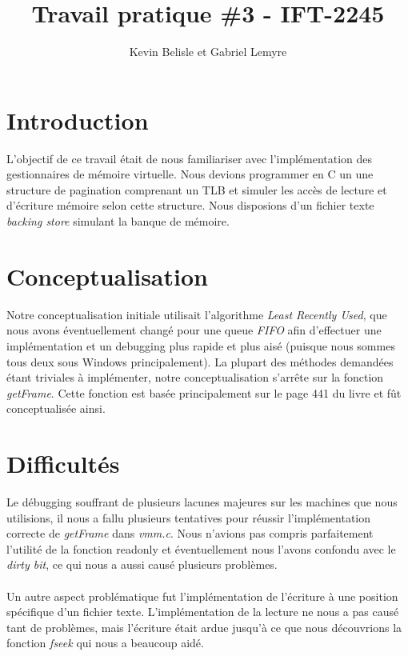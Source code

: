 \documentclass{article}
\title{Travail pratique \#3 - IFT-2245}
\author{Kevin Belisle et Gabriel Lemyre}
\begin{document}
\maketitle

\section{Introduction}

L'objectif de ce travail était de nous familiariser avec l'implémentation des gestionnaires de mémoire virtuelle. Nous devions programmer en C un une structure de pagination comprenant un TLB et simuler les accès de lecture et d'écriture mémoire selon cette structure. Nous disposions d'un fichier texte \textit{backing store} simulant la banque de mémoire.

\section{Conceptualisation}
Notre conceptualisation initiale utilisait l'algorithme \textit{Least Recently Used}, que nous avons éventuellement changé pour une queue \textit{FIFO} afin d'effectuer une implémentation et un debugging plus rapide et plus aisé (puisque nous sommes tous deux sous Windows principalement). La plupart des méthodes demandées étant triviales à implémenter, notre conceptualisation s'arrête sur la fonction \textit{getFrame}. Cette fonction est basée principalement sur le page 441 du livre et fût conceptualisée ainsi.

\section{Difficultés}
Le débugging souffrant de plusieurs lacunes majeures sur les machines que nous utilisions, il nous a fallu plusieurs tentatives pour réussir l'implémentation correcte de \textit{getFrame} dans \textit{vmm.c}. Nous n'avions pas compris parfaitement l'utilité de la fonction readonly et éventuellement nous l'avons confondu avec le \textit{dirty bit}, ce qui nous a aussi causé plusieurs problèmes.\\\\
Un autre aspect problématique fut l'implémentation de l'écriture à une position spécifique d'un fichier texte. L'implémentation de la lecture ne nous a pas causé tant de problèmes, mais l'écriture était ardue jusqu'à ce que nous découvrions la fonction \textit{fseek} qui nous a beaucoup aidé.
 
\end{document}
